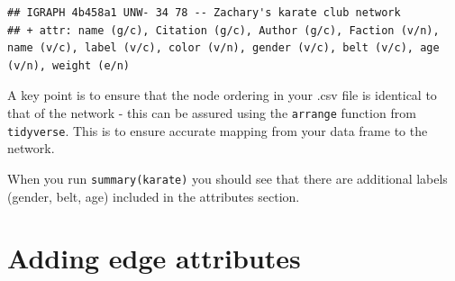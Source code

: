 \documentclass[
]{book}
\newenvironment{Shaded}{\begin{snugshade}}{\end{snugshade}}
\newcommand{\AttributeTok}[1]{\textcolor[rgb]{0.13,0.29,0.53}{#1}}
\newcommand{\CommentTok}[1]{\textcolor[rgb]{0.56,0.35,0.01}{\textit{#1}}}
\newcommand{\FunctionTok}[1]{\textcolor[rgb]{0.13,0.29,0.53}{\textbf{#1}}}
\newcommand{\NormalTok}[1]{#1}
\newcommand{\OtherTok}[1]{\textcolor[rgb]{0.56,0.35,0.01}{#1}}
\newcommand{\SpecialCharTok}[1]{\textcolor[rgb]{0.81,0.36,0.00}{\textbf{#1}}}
\newcommand{\StringTok}[1]{\textcolor[rgb]{0.31,0.60,0.02}{#1}}
\begin{document}
\begin{Shaded}
\end{Shaded}

\begin{verbatim}
## IGRAPH 4b458a1 UNW- 34 78 -- Zachary's karate club network
## + attr: name (g/c), Citation (g/c), Author (g/c), Faction (v/n), name (v/c), label (v/c), color (v/n), gender (v/c), belt (v/c), age (v/n), weight (e/n)
\end{verbatim}

A key point is to ensure that the node ordering in your .csv file is identical to that of the network - this can be assured using the \texttt{arrange} function from \texttt{tidyverse}. This is to ensure accurate mapping from your data frame to the network.

When you run \texttt{summary(karate)} you should see that there are additional labels (gender, belt, age) included in the attributes section.

\section{Adding edge attributes}\label{adding-edge-attributes}
\end{document}
